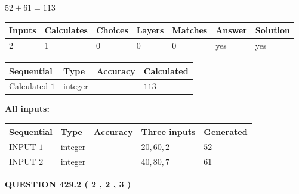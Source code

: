 \documentclass[12pt]{article}
\begin{document}
 

$ %
52 +  %
61=   %
113$
 
 
\noindent{}
 
 

 
   
   
   
   
\noindent\begin{tabular}{|l|l|l|l|l|l|l|}
 \hline
Inputs & Calculates & Choices & Layers & Matches & Answer & Solution \\ \hline
 2  & 
 1  & 
 0
  & 
 0  & 
 0  & 
  yes & 
  yes 
  \\ \hline
 \end{tabular}
   
   
   
   
\noindent{}
   
   
  
  
\noindent\begin{tabular}{|l|l|l|l|}
\hline
 Sequential & Type & Accuracy & Calculated \\ 
\hline
 
 
  Calculated $  1 $ & integer &  & 
  $ 113 $ 
 \\  \hline  
 \end{tabular}
   
   
   
   
\noindent\vspace{0.1in}\hspace{-0.08in} {\textbf{\Large{All inputs: }}}
   
   
  
  
\noindent\begin{tabular}{|l|l|l|l|l|}
\hline
 Sequential & Type & Accuracy & Three inputs & Generated \\ 
\hline
 
 
  INPUT $  1 $ & integer &  & $
 20
 , 
 60
 , 
 2
 $ & $ 52 $ 
 \\  \hline  
 
 
  INPUT $  2 $ & integer &  & $
 40
 , 
 80
 , 
 7
 $ & $ 61 $ 
 \\  \hline  
 \end{tabular}
   
   
  
\vspace{0.2in}
  
{\textbf{\Large{QUESTION
429.2 
 ( 2 , 2 , 3 )
}}}
  
\end{document}
